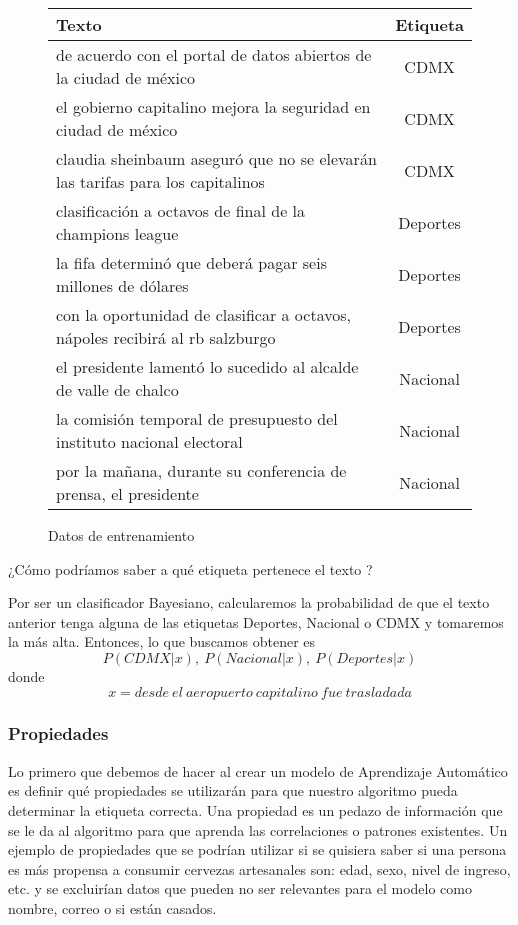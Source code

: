 \begin{figure}[H]
  \begin{center}
    \begin{tabular}{ l | c }
      Texto & Etiqueta \\ \hline
      de acuerdo con el portal de datos abiertos de la ciudad de méxico & CDMX  \\ \hline
      el gobierno capitalino mejora la seguridad en ciudad de méxico & CDMX  \\ \hline
      claudia sheinbaum aseguró que no se elevarán las tarifas para los capitalinos & CDMX  \\ \hline
      clasificación a octavos de final de la champions league & Deportes\\ \hline
      la fifa determinó que deberá pagar seis millones de dólares & Deportes  \\ \hline
      con la oportunidad de clasificar a octavos, nápoles recibirá al rb salzburgo & Deportes  \\ \hline
      el presidente lamentó lo sucedido al alcalde de valle de chalco & Nacional  \\ \hline
      la comisión temporal de presupuesto del instituto nacional electoral & Nacional  \\ \hline
      por la mañana, durante su conferencia de prensa, el presidente & Nacional  \\
    \end{tabular}
  \end{center}
  \caption{Datos de entrenamiento}
\end{figure}

¿Cómo podríamos saber a qué etiqueta pertenece el texto ?

Por ser un clasificador Bayesiano, calcularemos la probabilidad de que el texto anterior tenga alguna de las etiquetas Deportes, Nacional o CDMX y tomaremos la más alta. Entonces, lo que buscamos obtener es
\[P( CDMX | x ), \ P( Nacional | x ), \ P( Deportes | x )\]
donde
\[x = desde \ el \ aeropuerto \ capitalino \ fue \ trasladada \]

\subsubsection{Propiedades}

Lo primero que debemos de hacer al crear un modelo de Aprendizaje Automático es definir qué propiedades se utilizarán para que nuestro algoritmo pueda determinar la etiqueta correcta. Una propiedad es un pedazo de información que se le da al algoritmo para que aprenda las correlaciones o patrones existentes. Un ejemplo de propiedades que se podrían utilizar si se quisiera saber si una persona es más propensa a consumir cervezas artesanales son: edad, sexo, nivel de ingreso, etc. y se excluirían datos que pueden no ser relevantes para el modelo como nombre, correo o si están casados.

